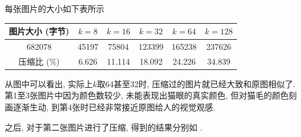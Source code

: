 \documentclass[lang=cn,11pt]{elegantpaper}
\begin{document}
每张图片的大小如下表所示
\begin{table}[h]
    \centering
    \begin{tabular}{c|ccccc}
    \hline
    图片大小 (字节)  & $k=8$   & $k=16$   & $k=32$   & $k=64$   & $k=128$  \\ \hline
    682078   & 45197 & 75804  & 123399 & 165238 & 237626 \\
    压缩比 (\%) & 6.626 & 11.114 & 18.092 & 24.226 & 34.839 \\ \hline
    \end{tabular}
\end{table}

从图中可以看出, 实际上$k$取64甚至32时, 压缩过的图片就已经大致和原图相似了. 第1至3张图片中因为颜色数较少, 未能表现出猫眼的真实颜色, 但对猫毛的颜色刻画逐渐生动, 到第4张时已经非常接近原图给人的视觉观感. 

之后, 对于第二张图片进行了压缩, 得到的结果分别如 .
\end{document}
